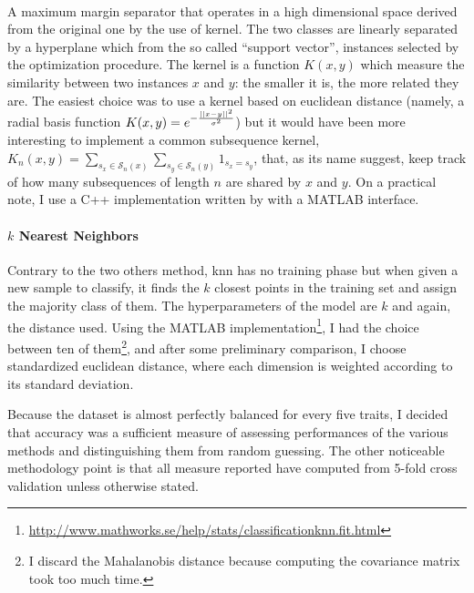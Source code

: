 \paragraph{}

A maximum margin separator that operates in a high dimensional space derived from the original one by the use of kernel. The two classes are linearly separated by a hyperplane which from the so called \enquote{support vector}, instances selected by the optimization procedure. The kernel is a function $K(x,y)$ which measure the similarity between two instances $x$ and $y$: the smaller it is, the more related they are. The easiest choice was to use a kernel based on euclidean distance (namely, a radial basis function $K(x,y)=e^{-\frac{\left|\left|x-y\right|\right|^2}{\sigma^2}}$) but it would have been more interesting to implement a common subsequence kernel\autocite{Lodhi2002kernel}, $K_n(x,y)=\sum_{s_x\in\mathcal{S}_n(x)}\sum_{s_y\in\mathcal{S}_n(y)}1_{s_x=s_y}$, that, as its name suggest, keep track of how many subsequences of length $n$ are shared by $x$ and $y$. On a practical note, I use a C++ implementation written by \textcite{Chang2001libsvm} with a MATLAB interface.

\paragraph{$k$ Nearest Neighbors}
Contrary to the two others method, \gls{knn} has no training phase but when given a new sample to classify, it finds the $k$ closest points in the training set and assign the majority class of them. The hyperparameters of the model are $k$ and again, the distance used. Using the MATLAB implementation\footnote{\href{http://www.mathworks.se/help/stats/classificationknn.fit.html}{http://www.mathworks.se/help/stats/classificationknn.fit.html}}, I had the choice between ten of them\footnote{I discard the Mahalanobis distance because computing the covariance matrix took too much time.}, and after some preliminary comparison, I choose standardized euclidean distance, where each dimension is weighted according to its standard deviation.


Because the dataset is almost perfectly balanced for every five traits, I decided that accuracy was a sufficient measure of assessing performances of the various methods and distinguishing them from random guessing. The other noticeable methodology point is that all measure reported have computed from 5-fold cross validation unless otherwise stated.

